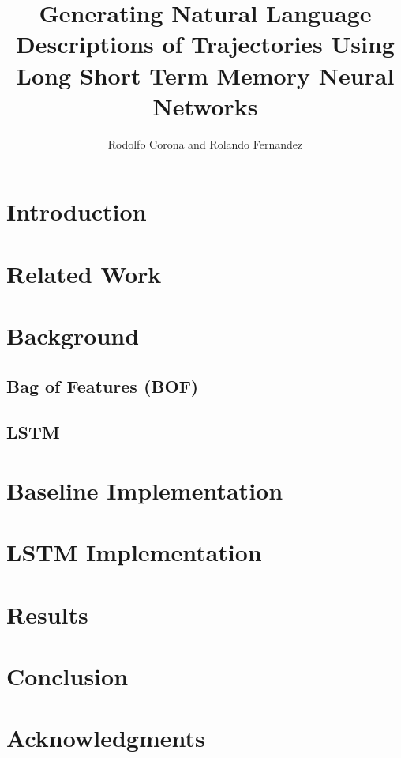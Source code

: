 \documentclass[letterpaper, 12 pt, conference]{ieeeconf}
\title{\LARGE \bf
Generating Natural Language Descriptions of Trajectories Using Long Short Term Memory Neural Networks}
\author{Rodolfo Corona and Rolando Fernandez}
\begin{document}
\maketitle
\thispagestyle{empty}
\pagestyle{empty}

\begin{abstract}

\end{abstract}

\section{Introduction}

\section{Related Work}

\section{Background}

\subsection{Bag of Features (BOF)}

\subsection{LSTM}

\section{Baseline Implementation}

\section{LSTM Implementation}

\section{Results}

\section{Conclusion}

\section{Acknowledgments}


%


\end{document}
